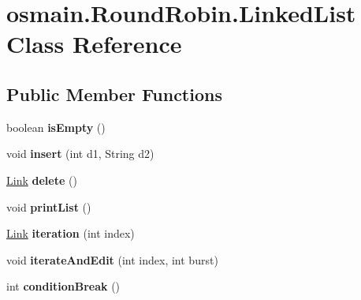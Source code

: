 \hypertarget{classosmain_1_1_round_robin_1_1_linked_list}{}\section{osmain.\+Round\+Robin.\+Linked\+List Class Reference}
\label{classosmain_1_1_round_robin_1_1_linked_list}
\subsection*{Public Member Functions}
\begin{DoxyCompactItemize}
\item 
boolean {\bfseries is\+Empty} ()\hypertarget{classosmain_1_1_round_robin_1_1_linked_list_a3bdff4628e604099d435a4b0cb3e0739}{}\label{classosmain_1_1_round_robin_1_1_linked_list_a3bdff4628e604099d435a4b0cb3e0739}

\item 
void {\bfseries insert} (int d1, String d2)\hypertarget{classosmain_1_1_round_robin_1_1_linked_list_af1c8de2a272f644f6e4c88df7894d934}{}\label{classosmain_1_1_round_robin_1_1_linked_list_af1c8de2a272f644f6e4c88df7894d934}

\item 
\hyperlink{classosmain_1_1_round_robin_1_1_link}{Link} {\bfseries delete} ()\hypertarget{classosmain_1_1_round_robin_1_1_linked_list_ad2b975893f19ec8d83f393b971cecef8}{}\label{classosmain_1_1_round_robin_1_1_linked_list_ad2b975893f19ec8d83f393b971cecef8}

\item 
void {\bfseries print\+List} ()\hypertarget{classosmain_1_1_round_robin_1_1_linked_list_a3178a79412d4edad5b8ae387697ff72e}{}\label{classosmain_1_1_round_robin_1_1_linked_list_a3178a79412d4edad5b8ae387697ff72e}

\item 
\hyperlink{classosmain_1_1_round_robin_1_1_link}{Link} {\bfseries iteration} (int index)\hypertarget{classosmain_1_1_round_robin_1_1_linked_list_a3ab68da5433e26e586d615a92f72d5b1}{}\label{classosmain_1_1_round_robin_1_1_linked_list_a3ab68da5433e26e586d615a92f72d5b1}

\item 
void {\bfseries iterate\+And\+Edit} (int index, int burst)\hypertarget{classosmain_1_1_round_robin_1_1_linked_list_a2a703d960cb3df54e935605ae68a5f15}{}\label{classosmain_1_1_round_robin_1_1_linked_list_a2a703d960cb3df54e935605ae68a5f15}

\item 
int {\bfseries condition\+Break} ()\hypertarget{classosmain_1_1_round_robin_1_1_linked_list_acac00e2440b079000e74c696c1e4c1d5}{}\label{classosmain_1_1_round_robin_1_1_linked_list_acac00e2440b079000e74c696c1e4c1d5}

\end{DoxyCompactItemize}


